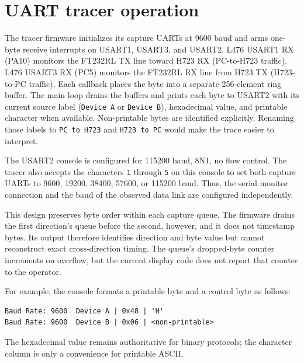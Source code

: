\documentclass[10pt,a4paper]{article}
\begin{document}
\section{UART tracer operation}
The tracer firmware initializes its capture UARTs at 9600 baud and arms one-byte receive interrupts on USART1, USART3, and USART2. L476 USART1 RX (PA10) monitors the FT232RL TX line toward H723 RX (PC-to-H723 traffic). L476 USART3 RX (PC5) monitors the FT232RL RX line from H723 TX (H723-to-PC traffic). Each callback places the byte into a separate 256-element ring buffer. The main loop drains the buffers and prints each byte to USART2 with its current source label (\texttt{Device A} or \texttt{Device B}), hexadecimal value, and printable character when available. Non-printable bytes are identified explicitly. Renaming those labels to \texttt{PC to H723} and \texttt{H723 to PC} would make the trace easier to interpret.

The USART2 console is configured for 115200 baud, 8N1, no flow control. The tracer also accepts the characters \texttt{1} through \texttt{5} on this console to set both capture UARTs to 9600, 19200, 38400, 57600, or 115200 baud. Thus, the serial monitor connection and the baud of the observed data link are configured independently.

This design preserves byte order within each capture queue. The firmware drains the first direction's queue before the second, however, and it does not timestamp bytes. Its output therefore identifies direction and byte value but cannot reconstruct exact cross-direction timing. The queue's dropped-byte counter increments on overflow, but the current display code does not report that counter to the operator.

For example, the console formats a printable byte and a control byte as follows:
\begin{verbatim}
Baud Rate: 9600  Device A | 0x48 | 'H'
Baud Rate: 9600  Device B | 0x06 | <non-printable>
\end{verbatim}
The hexadecimal value remains authoritative for binary protocols; the character column is only a convenience for printable ASCII.
\end{document}
